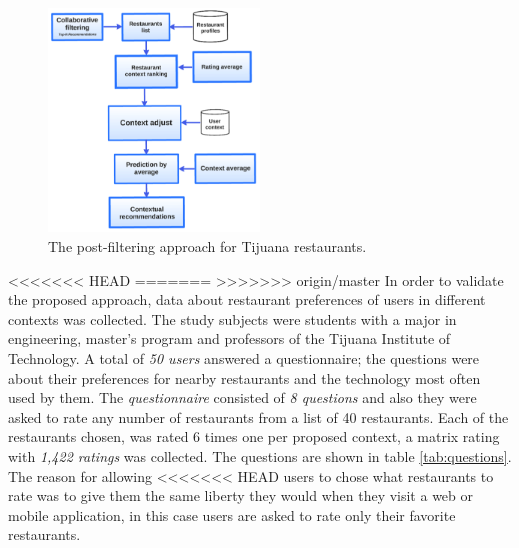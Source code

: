 \begin{figure}
\centering
\captionsetup{font=footnotesize}
\setlength\fboxsep{0pt}
\includegraphics[width=0.50\textwidth]{img/posfil.png}
\caption{The post-filtering approach for Tijuana restaurants.}
\label{fig:postfiltering}     
\end{figure}
<<<<<<< HEAD
=======
>>>>>>> origin/master
In order to validate the proposed approach, data about restaurant
preferences of users in different contexts was collected. The study
subjects were students  with a major in engineering,  
master’s program and professors of the Tijuana Institute of
Technology. A total of \textit{50 users} answered a questionnaire; the
questions were about their preferences for nearby restaurants and the
technology most often used by them. The \textit{questionnaire} consisted 
of \textit{8 questions} and also they were asked to rate any number of restaurants from a list of 40 restaurants.
Each of the restaurants chosen, was rated 6 times one per proposed 
context, a matrix rating with \textit{1,422 ratings} was collected. The
questions are shown in table \ref{tab:questions}. The reason for allowing
<<<<<<< HEAD
users to chose what restaurants to rate was to give them the same liberty
they would when they visit a web or mobile application, in this case 
users are asked to rate only their favorite restaurants.

